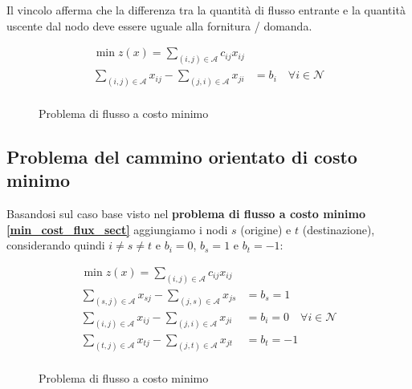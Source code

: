 \documentclass[\main/main.tex]{subfiles}
\begin{document}
Il vincolo afferma che la differenza tra  la quantità di flusso entrante e la quantità uscente dal nodo deve essere uguale alla fornitura / domanda.

\begin{figure}
	\begin{align*}
		\min z(x) = \sum_{(i,j) \in \mathcal{A}} c_{ij}x_{ij}                                                             \\
		\sum_{(i,j) \in \mathcal{A}} x_{ij} - \sum_{(j,i) \in \mathcal{A}} x_{ji} & = b_i \quad \forall i \in \mathcal{N} \\
	\end{align*}
	\caption{Problema di flusso a costo minimo}
\end{figure}

\subsection{Problema del cammino orientato di costo minimo}
Basandosi sul caso base visto nel \textbf{problema di flusso a costo minimo \ref{min_cost_flux_sect}} aggiungiamo i nodi $s$ (origine) e $t$ (destinazione), considerando quindi $i\neq s \neq t$ e $b_i = 0$, $b_s = 1$ e $b_t = -1$:

\begin{figure}
	\begin{align*}
		\min z(x) = \sum_{(i,j) \in \mathcal{A}} c_{ij}x_{ij}                                                                 \\
		\sum_{(s,j) \in \mathcal{A}} x_{sj} - \sum_{(j,s) \in \mathcal{A}} x_{js} & = b_s = 1                                 \\
		\sum_{(i,j) \in \mathcal{A}} x_{ij} - \sum_{(j,i) \in \mathcal{A}} x_{ji} & = b_i = 0 \quad \forall i \in \mathcal{N} \\
		\sum_{(t,j) \in \mathcal{A}} x_{tj} - \sum_{(j,t) \in \mathcal{A}} x_{jt} & = b_t = -1                                \\
	\end{align*}
	\caption{Problema di flusso a costo minimo}
\end{figure}
\end{document}
